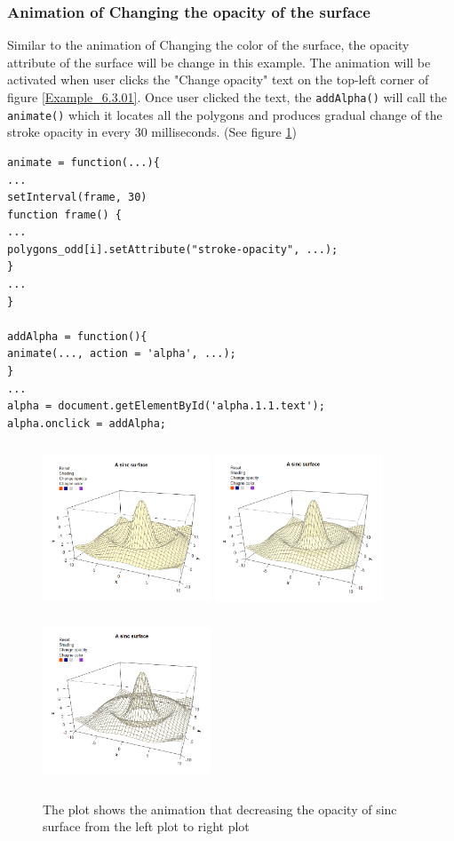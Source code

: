 \documentclass[paper=a4, fontsize=11pt]{report}
\begin{document}
\subsubsection*{Animation of Changing the opacity of the surface}
Similar to the animation of Changing the color of the surface, the opacity attribute of the surface will be change in this example. The animation will be activated when user clicks the "Change opacity" text on the top-left corner of figure \ref{Example_6.3.01}. Once user clicked the text, the \texttt{addAlpha()} will call the \texttt{animate()} which it locates all the polygons and produces gradual change of the stroke opacity in every 30 milliseconds. (See figure \ref{Example_6.3.2})
\begin{lstlisting}
animate = function(...){
...
setInterval(frame, 30)
function frame() {
...
polygons_odd[i].setAttribute("stroke-opacity", ...);
}
...
}

addAlpha = function(){
animate(..., action = 'alpha', ...);
}
...
alpha = document.getElementById('alpha.1.1.text');
alpha.onclick = addAlpha; 
\end{lstlisting}

\begin{figure}[h]
	\begin{center}
		\includegraphics[height = 5cm, width = 5cm]{figure/svg/origin_1.PNG}
		\includegraphics[height = 5cm, width = 5cm]{figure/svg/opacity_2.PNG}
		\includegraphics[height = 5cm, width = 5cm]{figure/svg/opacity_3.PNG}
		\caption{The plot shows the animation that decreasing the opacity of sinc surface from the left plot to right plot}
		\label{Example_6.3.2}
	\end{center}
\end{figure}
\end{document}
